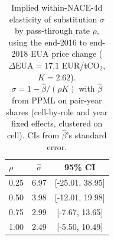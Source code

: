 \begin{table}[ht]
\centering
\caption{Implied within-NACE-4d elasticity of substitution $\sigma$ by pass-through rate $\rho$, using the end-2016 to end-2018 EUA price change ($\Delta\text{EUA} = 17.1$ EUR/tCO$_2$, $K = 2.62$). $\sigma = 1 - \hat\beta/(\rho K)$ with $\hat\beta$ from PPML on pair-year shares (cell-by-role and year fixed effects, clustered on cell). CIs from $\hat\beta$'s standard error.} 
\label{tab:phase4_within_intensive_ces_elasticity_sigma}
\begin{tabular}{lcc}
  \toprule
$\rho$ & $\hat\sigma$ & 95\% CI \\ 
  \midrule
0.25 & 6.97 & [-25.01, 38.95] \\ 
  0.50 & 3.98 & [-12.01, 19.98] \\ 
  0.75 & 2.99 & [-7.67, 13.65] \\ 
  1.00 & 2.49 & [-5.50, 10.49] \\ 
   \bottomrule
\end{tabular}
\end{table}
